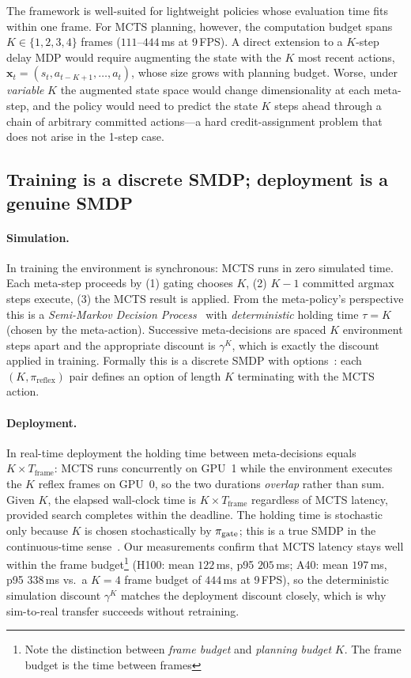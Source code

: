 The framework is well-suited for lightweight policies whose evaluation time
fits within one frame.
For MCTS planning, however, the computation budget spans $K \in \{1,2,3,4\}$
frames ($111$--$444$\,ms at 9\,FPS).
A direct extension to a $K$-step delay MDP would require augmenting the state
with the $K$ most recent actions,
$\mathbf{x}_t = (s_t, a_{t-K+1}, \ldots, a_t)$,
whose size grows with planning budget.
Worse, under \emph{variable} $K$ the augmented state space would change
dimensionality at each meta-step, and the policy would need to predict the
state $K$ steps ahead through a chain of arbitrary committed actions---a
hard credit-assignment problem that does not arise in the 1-step case.

\subsection*{Training is a discrete SMDP; deployment is a genuine SMDP}

\paragraph{Simulation.}
In training the environment is synchronous: MCTS runs in zero simulated time.
Each meta-step proceeds by (1) gating chooses $K$, (2) $K{-}1$ committed
argmax steps execute, (3) the MCTS result is applied.
From the meta-policy's perspective this is a
\emph{Semi-Markov Decision Process}~\citep{puterman1994mdp} with \emph{deterministic}
holding time $\tau = K$ (chosen by the meta-action).
Successive meta-decisions are spaced $K$ environment steps apart and the
appropriate discount is $\gamma^K$, which is exactly the discount applied
in training.
Formally this is a discrete SMDP with options~\citep{sutton1999between}:
each $(K, \pi_{\mathrm{reflex}})$ pair defines an option of length $K$ terminating
with the MCTS action.

\paragraph{Deployment.}
In real-time deployment the holding time between meta-decisions equals
$K \times T_{\mathrm{frame}}$: MCTS runs concurrently on GPU~1 while the
environment executes the $K$ reflex frames on GPU~0, so the two durations
\emph{overlap} rather than sum.
Given $K$, the elapsed wall-clock time is $K \times T_{\mathrm{frame}}$
regardless of MCTS latency, provided search completes within the deadline.
The holding time is stochastic only because $K$ is chosen stochastically
by $\pi_{\mathrm{gate}}$; this is a true SMDP in the continuous-time
sense~\citep{puterman1994mdp}.
Our measurements confirm that MCTS latency stays well within the frame budget\footnote{Note the distinction between \emph{frame budget} and \emph{planning budget} $K$. The frame budget is the time between frames}
(H100: mean $122$\,ms, p95 $205$\,ms; A40: mean $197$\,ms, p95 $338$\,ms
vs.\ a $K{=}4$ frame budget of $444$\,ms at 9\,FPS), so the deterministic
simulation discount $\gamma^K$ matches the deployment discount closely,
which is why sim-to-real transfer succeeds without retraining.


